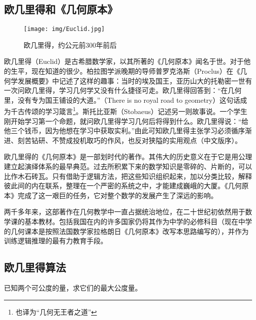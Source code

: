 \documentclass[UTF8]{article}
\begin{document}
\subsection{欧几里得和《几何原本》}

\begin{wrapfigure}{R}{0.4\textwidth}
 \centering
 \texttt{[image: img/Euclid.jpg]}
 \captionsetup{labelformat=empty}
 \caption{欧几里得，约公元前300年前后}
 \label{fig:Euclid}
\end{wrapfigure}

欧几里得（Euclid）是古希腊数学家，以其所著的《几何原本》闻名于世。对于他的生平，现在知道的很少。柏拉图学派晚期的导师普罗克洛斯（Proclus）在《几何学发展概要》中记述了这样的趣事：当时的埃及国王，亚历山大的托勒密一世有一次问欧几里得，学习几何学又没有什么捷径可走。欧几里得回答到：“在几何里，没有专为国王铺设的大道。”（There is no royal road to geometry）这句话成为千古传颂的学习箴言\footnote{也译为“几何无王者之道”}。斯托比亚斯（Stobaeus）记述另一则故事说。一个学生刚开始学习第一个命题，就问欧几里得学习几何后将得到什么。欧几里得说：“给他三个钱币，因为他想在学习中获取实利。”由此可知欧几里得主张学习必须循序渐进、刻苦钻研、不赞成投机取巧的作风，也反对狭隘的实用观点（\cite{Elements}中文版序）。

欧几里得的《几何原本》是一部划时代的著作。其伟大的历史意义在于它是用公理建立起演绎体系的最早典范。过去所积累下来的数学知识是零碎的、片断的，可以比作木石砖瓦。只有借助于逻辑方法，把这些知识组织起来，加以分类比较，解释彼此间的内在联系，整理在一个严密的系统之中，才能建成巍峨的大厦。《几何原本》完成了这一艰巨的任务，它对整个数学的发展产生了深远的影响。

两千多年来，这部著作在几何教学中一直占据统治地位，在二十世纪初依然用于数学课的基本教材。包括我国在内的许多国家仍将其作为中学的必修科目（现在中学的几何课本是按照法国数学家拉格朗日《几何原本》改写本思路编写的），并作为训练逻辑推理的最有力教育手段\cite{HanXueTao16}。

\subsection{欧几里得算法}

\begin{proposition}
已知两个可公度的量，求它们的最大公度量。
\end{proposition}
\end{document}
